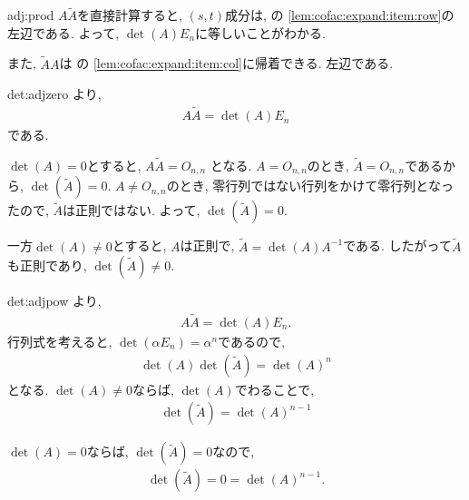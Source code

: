 \begin{proofof}{adj:prod}
  $A\tilde A$を直接計算すると,
  $(s,t)$成分は,
  の
  \cref{lem:cofac:expand:item:row}の
  左辺である.
  よって, $\det(A)E_n$に等しいことがわかる.

  また, $\tilde A A$は
  の
  \cref{lem:cofac:expand:item:col}に帰着できる.
  左辺である.
\end{proofof}

\begin{proofof*}{det:adj}{zero}
  より,
  \begin{align*}
    A \tilde A =\det(A)E_n
  \end{align*}
  である.

  $\det(A)=0$とすると,
  $A \tilde A =O_{n,n}$
  となる.
  $A=O_{n,n}$のとき, $\tilde A=O_{n,n}$であるから,
  $\det(\tilde A)=0$.
  $A\neq O_{n,n}$のとき,
  零行列ではない行列をかけて零行列となったので,
  $\tilde A$は正則ではない.
  よって, $\det(\tilde A)=0$.
  
  一方$\det(A)\neq 0$とすると,
  $A$は正則で,
  $\tilde A=\det(A)A^{-1}$である.
  したがって$\tilde A$も正則であり,
  $\det(\tilde A)\neq 0$.


\end{proofof*}
\begin{proofof*}{det:adj}{pow}
より,
\begin{align*}
  A \tilde A =\det(A)E_n.
\end{align*}
行列式を考えると,
$\det(\alpha E_n)=\alpha^n$であるので,
\begin{align*}
  \det(A) \det(\tilde A) =\det(A)^n
\end{align*}
となる.
$\det(A)\neq 0$ならば,
$\det(A)$でわることで,
\begin{align*}
  \det(\tilde A) =\det(A)^{n-1}
\end{align*}

$\det(A)=0$ならば, 
$\det(\tilde A)=0$なので,
\begin{align*}
  \det(\tilde A)=0 =\det(A)^{n-1}.
\end{align*}

\end{proofof*}
\endinput

\section{逆行列や正則に関する命題の証明}
ここでは, \Cref{chap:inverse}に現れる命題の証明を行う.
逆行列や正則行列に関する命題については,
一般の正方行列の場合について証明をしているので,
煩雑になっている部分がある.
$2$-次正方行列の場合のみについて証明をするのであれば,
直接計算をすることで示すほうが手っ取り早いものが多い.
行列式に関する命題は,
行列式を$2$次正方行列にしかここでは定義していないこともあり,
$2$-次正方行列の場合のみについて証明をしている.





